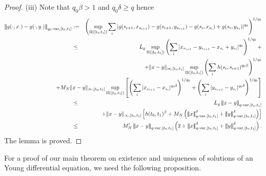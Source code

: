 \documentclass[10pt]{article}
\numberwithin{equation}{section} %
\newcommand{\ltn}{\ensuremath{\left| \! \left| \! \left|}}
\newcommand{\rtn}{\ensuremath{\right| \! \right| \! \right|}}
\begin{document}
\begin{proof}
	(iii) Note that $ q_0\beta>1$ and $ q_0\delta \geq q$ hence
	\begin{eqnarray}
	\ltn g(\cdot,x_.)-g(\cdot,y_.)\rtn_{q_0\text{-var},[t_0,t_{1}]}&:=& \left(\sup_{\Pi([t_0,t_1])} \sum_{i} | g(s_{i+1},x_{s_{i+1}})- g(s_{i+1},y_{s_{i+1}}) -g(s_i,x_{s_{i}}) +g(s_{i},y_{s_{i}}) |^{q_0}\right)^{1/q_0}\notag\\
	&\leq & L_g\sup_{\Pi([t_0,t_1])}\left(\sum_i |x_{s_{i+1}}-y_{s_{i+1}}-x_{s_i}+y_{s_i} |^{q_0}\right)^{1/q_0}+\notag\\
	&&\hspace*{-2cm} +  \|x-y\|_{\infty,[t_0,t_1]}\sup_{\Pi([t_0,t_1])}\left(\sum_i h(s_{i},s_{i+1})^{q_0\beta}\right)^{1/q_0}\notag\\
	&&\hspace*{-2cm}  + M_N \|x-y\|_{\infty,[t_0,t_1]} \sup_{\Pi([t_0,t_1])}\left[ \left(\sum_i |x_{s_{i+1}}-x_{s_i}|^{q_0\delta }\right)^{1/q_0}+\left(\sum_i |y_{s_{i+1}}-y_{s_i}|^{q_0\delta  }\right)^{1/q_0}\right]\notag\\
	&\leq& L_g\ltn x-y\rtn_{q\text{-var},[t_0,t_1]}\notag\\
	&&+ \|x-y\|_{\infty,[t_0,t_1]}\left[   h(t_0,t_1)^{\beta} + M_N \left(\ltn x\rtn^{\delta}_{q\text{-var},[t_0,t_{1}]}+\ltn y\rtn^{\delta}_{q\text{-var},[t_0,t_{1}]}\right)\right]\notag\\
	&\leq & M'_N\ltn x-y\rtn_{q\text{-var},[t_0,t_{1}]} \left(2+\ltn x\rtn^{\delta}_{q\text{-var},[t_0,t_{1}]}+\ltn y\rtn^{\delta}_{q\text{-var},[t_0,t_{1}]}\right).\notag
	\end{eqnarray}
	The lemma is proved.
\end{proof}

For a proof of our main theorem on existence and uniqueness of solutions of an Young  differential equation, we need the following proposition.
\end{document}
